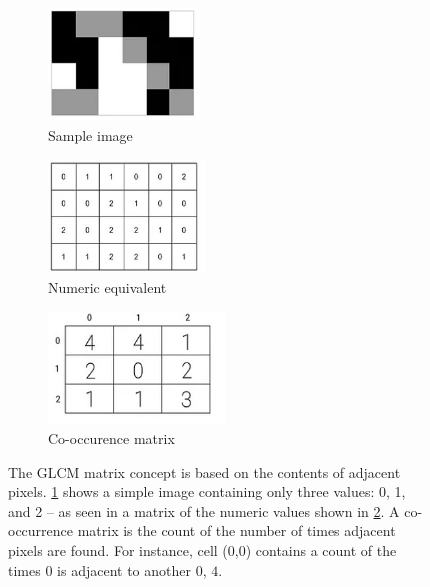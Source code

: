 \documentclass[letterpaper]{article}
\begin{document}
{\begin{figure}[H]
	\begin{subfigure}[h]{0.28\linewidth}
		\includegraphics[height=3cm]{./figures/glcm-example.jpg}
		\caption{Sample image}
		\label{subfig:glcm_sample}	
	\end{subfigure}
	\hfill
	\begin{subfigure}[h]{0.28\linewidth}
		\includegraphics[height=3cm]{./figures/glcm-numeric.jpg}
		\caption{Numeric equivalent}
		\label{subfig:glcm_numeric}		
	\end{subfigure}
	\hfill
	\begin{subfigure}[h]{0.28\linewidth}
		\includegraphics[height=3cm]{./figures/glcm-matrix.jpg}
		\caption{Co-occurence matrix}
		\label{subfig:glcm_matrix}		
	\end{subfigure}%
	\hfill
	\caption[GLCM matrix explained]{The GLCM matrix concept is based on the contents of adjacent pixels. \ref{subfig:glcm_sample} shows a simple image containing only three values: 0, 1, and 2 -- as seen in a matrix of the numeric values shown in \ref{subfig:glcm_numeric}. A co-occurrence matrix is the count of the number of times adjacent pixels are found.  For instance, cell (0,0) contains a count of the times $0$ is adjacent to another $0$, $4$.}
	\label{fig:glcm-explained}
\end{figure}
}
\end{document}
